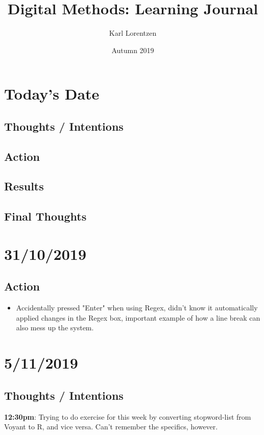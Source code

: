 \documentclass{article}
\title{Digital Methods: Learning Journal}
\author{Karl Lorentzen}
\date{Autumn 2019}
\begin{document}
\maketitle

\section{Today's Date}
\subsection{Thoughts / Intentions}
\subsection{Action}
\subsection{Results}
\subsection{Final Thoughts}

\pagebreak{}

\section{31/10/2019}

\subsection{Action}

\begin{itemize}
\item Accidentally pressed "Enter" when using Regex, didn't know it automatically applied changes in the Regex box, important example of how a line break can also mess up the system.
\end{itemize}

\section{5/11/2019}
\subsection{Thoughts / Intentions}

\textbf {12:30pm}: Trying to do exercise for this week by converting stopword-list from Voyant to R, and vice versa. Can't remember the specifics, however.
\end{document}
